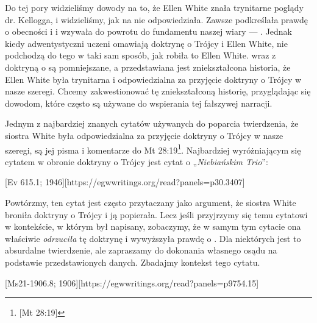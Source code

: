 
Do tej pory widzieliśmy dowody na to, że Ellen White znała trynitarne poglądy dr. Kellogga, i widzieliśmy, jak na nie odpowiedziała. Zawsze podkreślała prawdę o obecności i  i wzywała do powrotu do fundamentu naszej wiary — . Jednak kiedy adwentystyczni uczeni omawiają doktrynę o Trójcy i Ellen White, nie podchodzą do tego w taki sam sposób, jak robiła to Ellen White.  wraz z doktryną o  są pomniejszane, a przedstawiana jest zniekształcona historia, że Ellen White była trynitarna i odpowiedzialna za przyjęcie doktryny o Trójcy w nasze szeregi. Chcemy zakwestionować tę zniekształconą historię, przyglądając się dowodom, które często są używane do wspierania tej fałszywej narracji.

Jednym z najbardziej znanych cytatów używanych do poparcia twierdzenia, że siostra White była odpowiedzialna za przyjęcie doktryny o Trójcy w nasze szeregi, są jej pisma i komentarze do Mt 28:19\footnote{[Mt 28:19]}. Najbardziej wyróżniającym się cytatem w obronie doktryny o Trójcy jest cytat o „\textit{Niebiańskim Trio}”:

[Ev 615.1; 1946][https://egwwritings.org/read?panels=p30.3407]

Powtórzmy, ten cytat jest często przytaczany jako argument, że siostra White broniła doktryny o Trójcy i ją popierała. Lecz jeśli przyjrzymy się temu cytatowi w kontekście, w którym był napisany, zobaczymy, że w samym tym cytacie ona właściwie \textit{odrzuciła} tę doktrynę i wywyższyła prawdę o . Dla niektórych jest to absurdalne twierdzenie, ale zapraszamy do dokonania własnego osądu na podstawie przedstawionych danych. Zbadajmy kontekst tego cytatu.

[Ms21-1906.8; 1906][https://egwwritings.org/read?panels=p9754.15]


